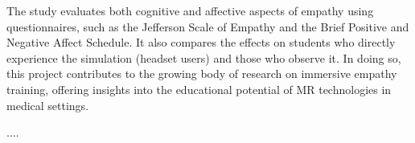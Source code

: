 The study evaluates both cognitive and affective aspects of empathy using  questionnaires, such as the Jefferson Scale of Empathy and the Brief Positive and Negative Affect Schedule. It also compares the effects on students who directly experience the simulation (headset users) and those who observe it. In doing so, this project contributes to the growing body of research on immersive empathy training, offering insights into the educational potential of MR technologies in medical settings.


....
